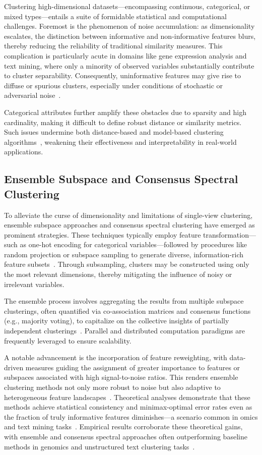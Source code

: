 \documentclass[sigconf]{acmart}
\begin{document}
Clustering high-dimensional datasets—encompassing continuous, categorical, or mixed types—entails a suite of formidable statistical and computational challenges. Foremost is the phenomenon of noise accumulation: as dimensionality escalates, the distinction between informative and non-informative features blurs, thereby reducing the reliability of traditional similarity measures. This complication is particularly acute in domains like gene expression analysis and text mining, where only a minority of observed variables substantially contribute to cluster separability. Consequently, uninformative features may give rise to diffuse or spurious clusters, especially under conditions of stochastic or adversarial noise~\cite{ref116}. 

Categorical attributes further amplify these obstacles due to sparsity and high cardinality, making it difficult to define robust distance or similarity metrics. Such issues undermine both distance-based and model-based clustering algorithms~\cite{ref116}, weakening their effectiveness and interpretability in real-world applications.

\subsection{Ensemble Subspace and Consensus Spectral Clustering}

To alleviate the curse of dimensionality and limitations of single-view clustering, ensemble subspace approaches and consensus spectral clustering have emerged as prominent strategies. These techniques typically employ feature transformation—such as one-hot encoding for categorical variables—followed by procedures like random projection or subspace sampling to generate diverse, information-rich feature subsets~\cite{ref96,ref116}. Through subsampling, clusters may be constructed using only the most relevant dimensions, thereby mitigating the influence of noisy or irrelevant variables.

The ensemble process involves aggregating the results from multiple subspace clusterings, often quantified via co-association matrices and consensus functions (e.g., majority voting), to capitalize on the collective insights of partially independent clusterings~\cite{ref97,ref101}. Parallel and distributed computation paradigms are frequently leveraged to ensure scalability.

A notable advancement is the incorporation of feature reweighting, with data-driven measures guiding the assignment of greater importance to features or subspaces associated with high signal-to-noise ratios. This renders ensemble clustering methods not only more robust to noise but also adaptive to heterogeneous feature landscapes~\cite{ref99,ref116}. Theoretical analyses demonstrate that these methods achieve statistical consistency and minimax-optimal error rates even as the fraction of truly informative features diminishes—a scenario common in omics and text mining tasks~\cite{ref96,ref116}. Empirical results corroborate these theoretical gains, with ensemble and consensus spectral approaches often outperforming baseline methods in genomics and unstructured text clustering tasks~\cite{ref116}.
\end{document}
